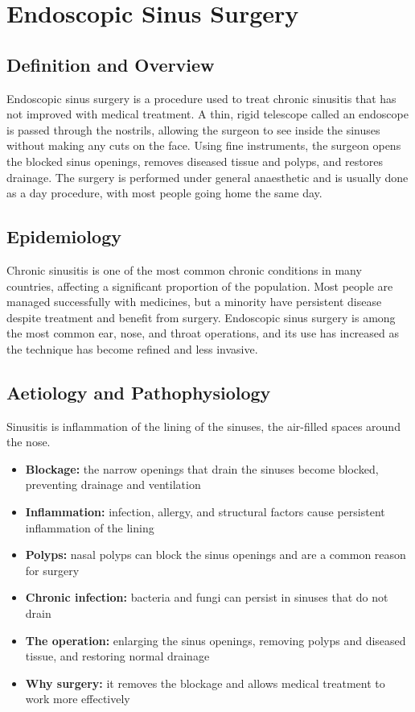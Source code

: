 \chapter{Endoscopic Sinus Surgery}

\section*{Definition and Overview}
Endoscopic sinus surgery is a procedure used to treat chronic sinusitis that has not improved with medical treatment. A thin, rigid telescope called an endoscope is passed through the nostrils, allowing the surgeon to see inside the sinuses without making any cuts on the face. Using fine instruments, the surgeon opens the blocked sinus openings, removes diseased tissue and polyps, and restores drainage. The surgery is performed under general anaesthetic and is usually done as a day procedure, with most people going home the same day.

\section*{Epidemiology}
Chronic sinusitis is one of the most common chronic conditions in many countries, affecting a significant proportion of the population. Most people are managed successfully with medicines, but a minority have persistent disease despite treatment and benefit from surgery. Endoscopic sinus surgery is among the most common ear, nose, and throat operations, and its use has increased as the technique has become refined and less invasive.

\section*{Aetiology and Pathophysiology}
Sinusitis is inflammation of the lining of the sinuses, the air-filled spaces around the nose.
\begin{itemize}
    \item \textbf{Blockage:} the narrow openings that drain the sinuses become blocked, preventing drainage and ventilation
    \item \textbf{Inflammation:} infection, allergy, and structural factors cause persistent inflammation of the lining
    \item \textbf{Polyps:} nasal polyps can block the sinus openings and are a common reason for surgery
    \item \textbf{Chronic infection:} bacteria and fungi can persist in sinuses that do not drain
    \item \textbf{The operation:} enlarging the sinus openings, removing polyps and diseased tissue, and restoring normal drainage
    \item \textbf{Why surgery:} it removes the blockage and allows medical treatment to work more effectively
\end{itemize}

